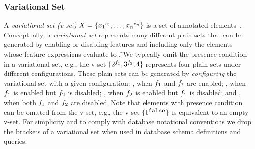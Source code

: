 \subsubsection{Variational Set}
\label{sec:vlist-vset}

A \emph{variational set (v-set)} $\vset = \setDef {\annot [\dimMeta_1] {\elem_1},\ldots, \annot [\dimMeta_n] {\elem_n}}$ 
is a set of annotated elements~\cite{EWC13fosd,Walk14onward,ATW17dbpl}.
%
Conceptually, a \emph{variational set} represents many different plain sets
that can be generated by enabling or disabling features
and including only the elements whose feature expressions evaluate to \t.
We typically omit the presence condition  in a variational set,
e.g., the v-set 
$\setDef {\annot [\A] 2, \annot [\B] 3, 4}$
represents four plain sets under different configurations. These plain
sets can be generated by \emph{configuring} the variational set with a
given configuration: 
, when $\A$ and $\B$
are enabled; , when $\A$ is enabled but $\B$ is disabled;
, when $\B$ is enabled but $\A$ is disabled;
and , when both $\A$ and $\B$ are disabled.
%
Note that elements with presence condition  can be omitted
from the v-set, e.g., the v-set \ensuremath{\setDef {\annot [\f] {1}}} is 
equivalent to an empty v-set.
For simplicity and to comply with database notational conventions
we drop the brackets of a variational set when used in database
schema definitions and queries.

